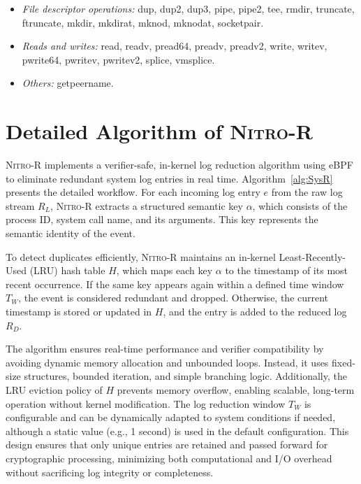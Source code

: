 \documentclass[sigconf]{sty/acmart}
\newcommand{\SysR}{\mbox{\textsc{Nitro-R}}\xspace}
\begin{document}
\begin{appendix}
\begin{itemize}
\item \emph{File descriptor operations:}  dup, dup2, dup3, pipe, pipe2, tee, rmdir,   truncate, ftruncate, mkdir, mkdirat, mknod, mknodat, socketpair.

\item \emph{Reads and writes:} read, readv, pread64, preadv, preadv2,  write, writev, pwrite64, pwritev, pwritev2,   splice,   vmsplice.

\item \emph{Others:} getpeername.
\end{itemize}

\section{Detailed Algorithm of \SysR}

\SysR implements a verifier-safe, in-kernel log reduction algorithm using eBPF to eliminate redundant system log entries in real time. Algorithm~\ref{alg:SysR} presents the detailed workflow. For each incoming log entry $e$ from the raw log stream $R_L$, \SysR extracts a structured semantic key $\alpha$, which consists of the process ID, system call name, and its arguments. This key represents the semantic identity of the event.

To detect duplicates efficiently, \SysR maintains an in-kernel Least-Recently-Used (LRU) hash table $H$, which maps each key $\alpha$ to the timestamp of its most recent occurrence. If the same key appears again within a defined time window $T_W$, the event is considered redundant and dropped. Otherwise, the current timestamp is stored or updated in $H$, and the entry is added to the reduced log $R_D$.

The algorithm ensures real-time performance and verifier compatibility by avoiding dynamic memory allocation and unbounded loops. Instead, it uses fixed-size structures, bounded iteration, and simple branching logic. Additionally, the LRU eviction policy of $H$ prevents memory overflow, enabling scalable, long-term operation without kernel modification. The log reduction window $T_W$ is configurable and can be dynamically adapted to system conditions if needed, although a static value (e.g., 1 second) is used in the default configuration. This design ensures that only unique entries are retained and passed forward for cryptographic processing, minimizing both computational and I/O overhead without sacrificing log integrity or completeness.

\begin{algorithm}[h]
    \SetAlgoNoEnd
    \small
    \DontPrintSemicolon
    

\end{algorithm}
\end{appendix}
\end{document}

